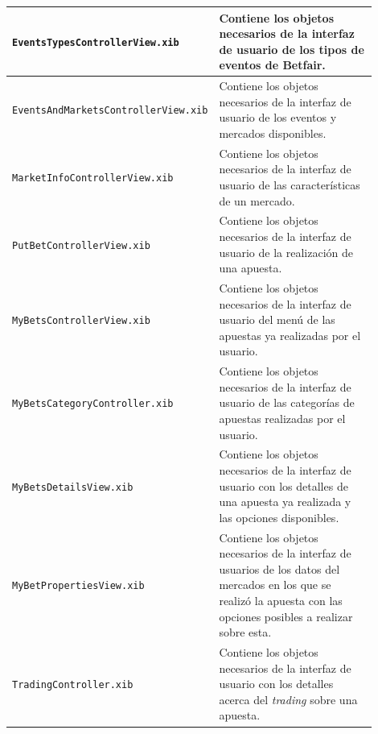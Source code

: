 \begin{center}
\begin{supertabular}{||p{0.45\linewidth}|p{0.45\linewidth}||}
\hline
\lstinline!EventsTypesControllerView.xib! & Contiene los objetos necesarios de la interfaz de usuario de los tipos de eventos de Betfair. \\
\hline
\lstinline!EventsAndMarketsControllerView.xib! & Contiene los objetos necesarios de la interfaz de usuario de los eventos y mercados disponibles. \\
\hline
\lstinline!MarketInfoControllerView.xib! & Contiene los objetos necesarios de la interfaz de usuario de las características de un mercado. \\
\hline
\lstinline!PutBetControllerView.xib! & Contiene los objetos necesarios de la interfaz de usuario de la realización de una apuesta. \\
\hline
\lstinline!MyBetsControllerView.xib! & Contiene los objetos necesarios de la interfaz de usuario del menú de las apuestas ya realizadas por el usuario. \\
\hline
\lstinline!MyBetsCategoryController.xib! & Contiene los objetos necesarios de la interfaz de usuario de las categorías de apuestas realizadas por el usuario. \\
\hline
\lstinline!MyBetsDetailsView.xib! & Contiene los objetos necesarios de la interfaz de usuario con los detalles de una apuesta ya realizada y las opciones disponibles. \\
\hline
\lstinline!MyBetPropertiesView.xib! & Contiene los objetos necesarios de la interfaz de usuarios de los datos del mercados en los que se realizó la apuesta con las opciones posibles a realizar sobre esta. \\
\hline
\lstinline!TradingController.xib! & Contiene los objetos necesarios de la interfaz de usuario con los detalles acerca del \emph{trading} sobre una apuesta. \\
\hline 
\hline 
\end{supertabular} 
\label{fig:componentes}
\end{center} 

